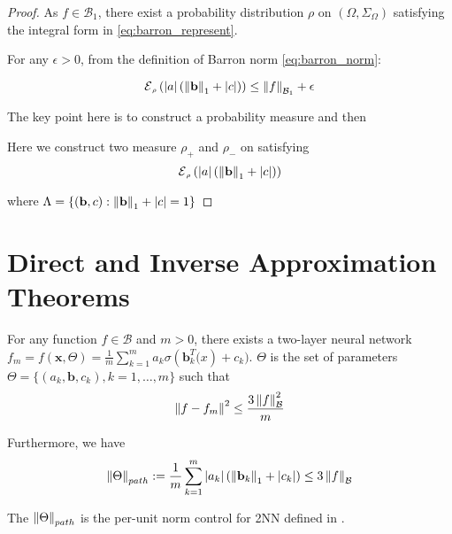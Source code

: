 \begin{proof}
    As $f \in \mathcal{B}_1$,  there exist a probability distribution $\rho$ on
    $(\Omega, \Sigma_\Omega)$ satisfying the integral form in
    \eqref{eq:barron_represent}.

    For any $\epsilon > 0$, from the definition of Barron norm
    \eqref{eq:barron_norm}:

    \begin{equation}
        \ERWi{\rho}{\abs{a}(\norm{\mathbf{b}}_1 + \abs{c})} \leq \barronnorm{f}{1} + \epsilon
    \end{equation}


    The key point here is to construct a probability measure and then

    Here we construct two measure $\rho_+$ and $\rho_-$ on satisfying
    \begin{equation*}
        \ERWi{\rho}{\abs{a}(\norm{\mathbf{b}}_1 + \abs{c})}
    \end{equation*}


    where $\Lambda = \{(\mathbf{b}, c): \left\| \mathbf{b} \right\|_1 + \left| c \right| = 1\}$
\end{proof}

\section{Direct and Inverse Approximation Theorems}

\begin{theorem} 
    For any function $f \in \mathcal{B}$ and $m > 0$, there exists a two-layer
    neural network $f_m = f(\mathbf{x}, \Theta) = \frac{1}{m}\sum_{k=1}^m a_k
        \sigma(\mathbf{b}_k^T \mathbf(x) + c_k)$. $\Theta$ is the set of parameters
    $\Theta = \{(a_k, \mathbf{b}, c_k), k=1,\dots,m\}$ such that
    \begin{equation*}
        \left\| f - f_m \right\|^2 \leq \frac{3\left\| f \right\|_{\mathcal{B}}^2}{m}
    \end{equation*}

    Furthermore, we have
    \begin{equation}
        \left\| \Theta \right\|_{path} := \frac{1}{m} \sum_{k=1}^m \left| a_k \right| (\left\| \mathbf{b}_k \right\|_1 + \left| c_k \right|)
        \leq 3\left\| f \right\|_{\mathcal{B}}
    \end{equation}
\end{theorem}

The $\left\| \Theta \right\|_{path}$ is the per-unit norm control for 2NN defined in
\cite{neyshaburNormBasedCapacityControl2015}. 

